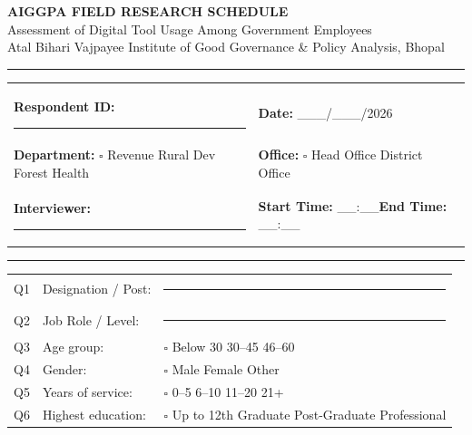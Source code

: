 \documentclass[10pt,a4paper]{article}
\newcommand{\blank}{\rule{8cm}{0.4pt}}
\begin{document}
\begin{center}
{\Large\bfseries AIGGPA FIELD RESEARCH SCHEDULE}\\[2pt]
{\small Assessment of Digital Tool Usage Among Government Employees}\\[2pt]
{\small Atal Bihari Vajpayee Institute of Good Governance \& Policy Analysis, Bhopal}
\end{center}
\vspace{4pt}
\noindent\rule{\textwidth}{1pt}
\vspace{4pt}

\noindent\begin{tabularx}{\textwidth}{@{}L{7cm} L{7cm}@{}}
\textbf{Respondent ID:} \blank & \textbf{Date:} \_\_\_/\_\_\_/2026 \\[8pt]
\textbf{Department:} {\Large$\square$} Revenue\quad{\Large$\square$} Rural Dev\quad{\Large$\square$} Forest\quad{\Large$\square$} Health & \textbf{Office:} {\Large$\square$} Head Office\quad{\Large$\square$} District Office \\[8pt]
\textbf{Interviewer:} \blank & \textbf{Start Time:} \_\_:\_\_\quad\textbf{End Time:} \_\_:\_\_ \\
\end{tabularx}

\vspace{4pt}\noindent\rule{\textwidth}{0.5pt}\vspace{4pt}

\vspace{3pt}

\noindent\begin{tabularx}{\textwidth}{@{}L{0.5cm} L{8cm} X@{}}
Q1 & Designation / Post: & \blank \\[3pt]
Q2 & Job Role / Level: & \blank \\[3pt]
Q3 & Age group: & {\Large$\square$} Below 30\quad{\Large$\square$} 30--45\quad{\Large$\square$} 46--60 \\[3pt]
Q4 & Gender: & {\Large$\square$} Male\quad{\Large$\square$} Female\quad{\Large$\square$} Other \\[3pt]
Q5 & Years of service: & {\Large$\square$} 0--5\quad{\Large$\square$} 6--10\quad{\Large$\square$} 11--20\quad{\Large$\square$} 21+ \\[3pt]
Q6 & Highest education: & {\Large$\square$} Up to 12th\quad{\Large$\square$} Graduate\quad{\Large$\square$} Post-Graduate\quad{\Large$\square$} Professional \\
\end{tabularx}
\end{document}
